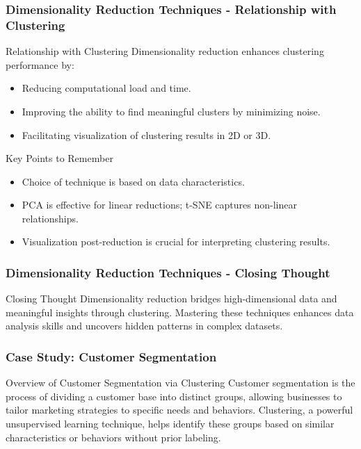 \documentclass[aspectratio=169]{beamer}
\begin{document}
\begin{frame}[fragile]
    \frametitle{Dimensionality Reduction Techniques - Relationship with Clustering}
    \begin{block}{Relationship with Clustering}
        Dimensionality reduction enhances clustering performance by:
        \begin{itemize}
            \item Reducing computational load and time.
            \item Improving the ability to find meaningful clusters by minimizing noise.
            \item Facilitating visualization of clustering results in 2D or 3D.
        \end{itemize}
    \end{block}
    
    \begin{block}{Key Points to Remember}
        \begin{itemize}
            \item Choice of technique is based on data characteristics.
            \item PCA is effective for linear reductions; t-SNE captures non-linear relationships.
            \item Visualization post-reduction is crucial for interpreting clustering results.
        \end{itemize}
    \end{block}
\end{frame}

\begin{frame}[fragile]
    \frametitle{Dimensionality Reduction Techniques - Closing Thought}
    \begin{block}{Closing Thought}
        Dimensionality reduction bridges high-dimensional data and meaningful insights through clustering. Mastering these techniques enhances data analysis skills and uncovers hidden patterns in complex datasets.
    \end{block}
\end{frame}

\begin{frame}[fragile]
    \frametitle{Case Study: Customer Segmentation}
    
    \begin{block}{Overview of Customer Segmentation via Clustering}
        Customer segmentation is the process of dividing a customer base into distinct groups, allowing businesses to tailor marketing strategies to specific needs and behaviors. Clustering, a powerful unsupervised learning technique, helps identify these groups based on similar characteristics or behaviors without prior labeling.
    \end{block}
\end{frame}
\end{document}
